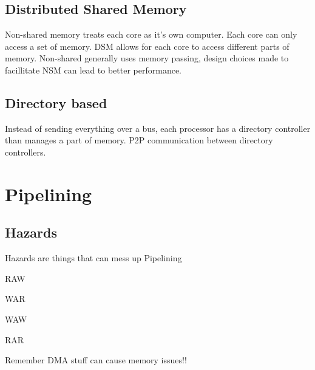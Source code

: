 \documentclass{article}
\begin{document}
\subsection{Distributed Shared Memory}

Non-shared memory treats each core as it's own computer. Each core can only access a set of memory.
DSM allows for each core to access different parts of memory. Non-shared generally uses memory passing, 
design choices made to facillitate NSM can lead to better performance. 

\subsection{Directory based}

Instead of sending everything over a bus, each processor has a directory controller than manages
a part of memory. P2P communication between directory controllers. 

\section{Pipelining}

\subsection{Hazards}

Hazards are things that can mess up Pipelining

RAW

WAR

WAW

RAR 

Remember DMA stuff can cause memory issues!!
\end{document}
